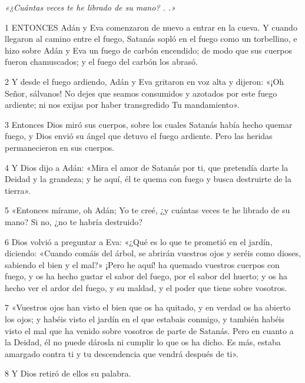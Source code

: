 \par \textit{«¿Cuántas veces te he librado de su mano? . .»}

\par 1 ENTONCES Adán y Eva comenzaron de nuevo a entrar en la cueva. Y cuando llegaron al camino entre el fuego, Satanás sopló en el fuego como un torbellino, e hizo sobre Adán y Eva un fuego de carbón encendido; de modo que sus cuerpos fueron chamuscados; y el fuego del carbón los abrasó.

\par 2 Y desde el fuego ardiendo, Adán y Eva gritaron en voz alta y dijeron: «¡Oh Señor, sálvanos! No dejes que seamos consumidos y azotados por este fuego ardiente; ni nos exijas por haber transgredido Tu mandamiento».

\par 3 Entonces Dios miró sus cuerpos, sobre los cuales Satanás había hecho quemar fuego, y Dios envió su ángel que detuvo el fuego ardiente. Pero las heridas permanecieron en sus cuerpos.

\par 4 Y Dios dijo a Adán: «Mira el amor de Satanás por ti, que pretendía darte la Deidad y la grandeza; y he aquí, él te quema con fuego y busca destruirte de la tierra».

\par 5 «Entonces mírame, oh Adán; Yo te creé, ¿y cuántas veces te he librado de su mano? Si no, ¿no te habría destruido?

\par 6 Dios volvió a preguntar a Eva: «¿Qué es lo que te prometió en el jardín, diciendo: «Cuando comáis del árbol, se abrirán vuestros ojos y seréis como dioses, sabiendo el bien y el mal?» ¡Pero he aquí! ha quemado vuestros cuerpos con fuego, y os ha hecho gustar el sabor del fuego, por el sabor del huerto; y os ha hecho ver el ardor del fuego, y su maldad, y el poder que tiene sobre vosotros.

\par 7 «Vuestros ojos han visto el bien que os ha quitado, y en verdad os ha abierto los ojos; y habéis visto el jardín en el que estabais conmigo, y también habéis visto el mal que ha venido sobre vosotros de parte de Satanás. Pero en cuanto a la Deidad, él no puede dárosla ni cumplir lo que os ha dicho. Es más, estaba amargado contra ti y tu descendencia que vendrá después de ti».

\par 8 Y Dios retiró de ellos su palabra.

